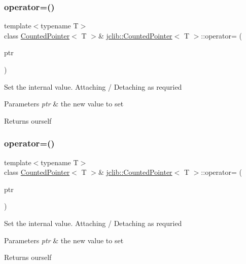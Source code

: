 \subsubsection{\texorpdfstring{operator=()}{operator=()}\hspace{0.1cm}{\footnotesize\ttfamily [1/2]}}
{\footnotesize\ttfamily template$<$typename T$>$ \\
class \hyperlink{classjclib_1_1CountedPointer}{Counted\+Pointer}$<$ T $>$\& \hyperlink{classjclib_1_1CountedPointer}{jclib\+::\+Counted\+Pointer}$<$ T $>$\+::operator= (\begin{DoxyParamCaption}\item[{T $\ast$const}]{ptr }\end{DoxyParamCaption})\hspace{0.3cm}{\ttfamily [inline]}}

Set the internal value. Attaching / Detaching as requried 
\begin{DoxyParams}{Parameters}
{\em ptr} & the new value to set \\
\hline
\end{DoxyParams}
\begin{DoxyReturn}{Returns}
ourself 
\end{DoxyReturn}
\mbox{\label{classjclib_1_1CountedPointer_a9321167f476a9bbc6b51477db8ba41f4}} 
\subsubsection{\texorpdfstring{operator=()}{operator=()}\hspace{0.1cm}{\footnotesize\ttfamily [2/2]}}
{\footnotesize\ttfamily template$<$typename T$>$ \\
class \hyperlink{classjclib_1_1CountedPointer}{Counted\+Pointer}$<$ T $>$\& \hyperlink{classjclib_1_1CountedPointer}{jclib\+::\+Counted\+Pointer}$<$ T $>$\+::operator= (\begin{DoxyParamCaption}\item[{const \hyperlink{classjclib_1_1CountedPointer}{Counted\+Pointer}$<$ T $>$ \&}]{ptr }\end{DoxyParamCaption})\hspace{0.3cm}{\ttfamily [inline]}}

Set the internal value. Attaching / Detaching as requried 
\begin{DoxyParams}{Parameters}
{\em ptr} & the new value to set \\
\hline
\end{DoxyParams}
\begin{DoxyReturn}{Returns}
ourself 
\end{DoxyReturn}
\mbox{\label{classjclib_1_1CountedPointer_a11f97ba1153ce2caabe2e44990b54807}} 
